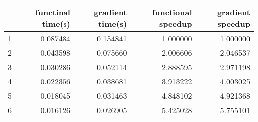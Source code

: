 \begin{tabular}{lrrrr}
\toprule
{} &  functinal time(s) &  gradient time(s) &  functional speedup &  gradient speedup \\
\midrule
1 &           0.087484 &          0.154841 &            1.000000 &          1.000000 \\
2 &           0.043598 &          0.075660 &            2.006606 &          2.046537 \\
3 &           0.030286 &          0.052114 &            2.888595 &          2.971198 \\
4 &           0.022356 &          0.038681 &            3.913222 &          4.003025 \\
5 &           0.018045 &          0.031463 &            4.848102 &          4.921368 \\
6 &           0.016126 &          0.026905 &            5.425028 &          5.755101 \\
\bottomrule
\end{tabular}
